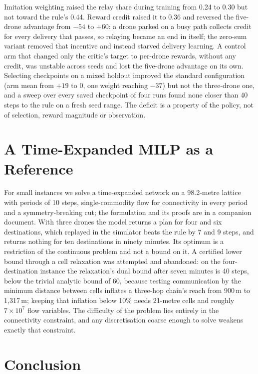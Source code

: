 \documentclass[12pt]{article}
\begin{document}
Imitation weighting raised the relay share during training from 0.24 to 0.30 but not toward
the rule's 0.44. Reward credit raised it to 0.36 and reversed the five-drone advantage from
$-54$ to $+60$: a drone parked on a busy path collects credit for every delivery that passes,
so relaying became an end in itself; the zero-sum variant removed that incentive and instead
starved delivery learning. A control arm that changed only the critic's target to per-drone
rewards, without any credit, was unstable across seeds and lost the five-drone advantage on its
own. Selecting checkpoints on a mixed holdout improved the standard configuration (arm mean from
$+19$ to $0$, one weight reaching $-37$) but not the three-drone one, and a sweep over every saved
checkpoint of four runs found none closer than 40 steps to the rule on a fresh seed range. The
deficit is a property of the policy, not of selection, reward magnitude or observation.

\section{A Time-Expanded MILP as a Reference}
\label{sec:milp}

For small instances we solve a time-expanded network on a 98.2-metre lattice with periods of 10
steps, single-commodity flow for connectivity in every period and a symmetry-breaking cut; the
formulation and its proofs are in a companion document. With three drones the model returns a
plan for four and six destinations, which replayed in the simulator beats the rule by 7 and 9
steps, and returns nothing for ten destinations in ninety minutes. Its optimum is a restriction
of the continuous problem and not a bound on it. A certified lower bound through a cell
relaxation was attempted and abandoned: on the four-destination instance the relaxation's dual
bound after seven minutes is 40 steps, below the trivial analytic bound of 60, because testing
communication by the minimum distance between cells inflates a three-hop chain's reach from
900\,m to 1{,}317\,m; keeping that inflation below 10\% needs 21-metre cells and roughly
$7 \times 10^{7}$ flow variables. The difficulty of the problem lies entirely in the connectivity
constraint, and any discretisation coarse enough to solve weakens exactly that constraint.

\section{Conclusion}
\end{document}
